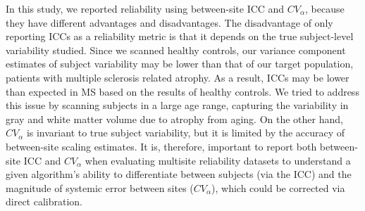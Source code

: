 In this study, we reported reliability using between-site ICC and $CV_{\alpha}$, because they have different advantages and disadvantages. The disadvantage of only reporting ICCs as a reliability metric is that it depends on the true subject-level variability studied. Since we scanned healthy controls, our variance component estimates of subject variability may be lower than that of our target population, patients with multiple sclerosis related atrophy. As a result, ICCs may be lower than expected in MS based on the results of healthy controls. We tried to address this issue by scanning subjects in a large age range, capturing the variability in gray and white matter volume due to atrophy from aging. On the other hand, $CV_{\alpha}$ is invariant to true subject variability, but it is limited by the accuracy of between-site scaling estimates. It is, therefore, important to report both between-site ICC and $CV_{\alpha}$ when evaluating multisite reliability datasets to understand a given algorithm's ability to differentiate between subjects (via the ICC) and the magnitude of systemic error between sites ($CV_{\alpha}$), which could be corrected via direct calibration.